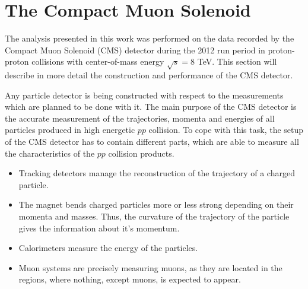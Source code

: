 
\section{The Compact Muon Solenoid}\label{sec:CMS}

The analysis presented in this work was performed on the data recorded by the Compact Muon Solenoid (CMS) detector\cite{CMSatLHC} during the 2012
run period in proton-proton collisions with center-of-mass energy $\sqrt{s} = $8 TeV. This section will describe in more detail 
the construction and performance of the CMS detector.

Any particle detector is being constructed with respect to the measurements which are planned to be done with it. The main purpose of the CMS detector
is the accurate measurement of the trajectories, momenta and energies of all particles produced in high energetic $pp$ collision. 
To cope with this task, the setup of the CMS detector has to contain different parts, which are able to measure all the characteristics of the 
$pp$ collision products.

\begin{itemize}
 \item Tracking detectors manage the reconstruction of the trajectory of a charged particle. 
 
 \item The magnet bends charged particles more or less strong depending on their momenta and masses. 
 Thus, the curvature of the trajectory of the particle gives the information about it's momentum.
 
 \item Calorimeters measure the energy of the particles.
 
 \item Muon systems are precisely measuring muons, as they are located in the regions, where nothing, except muons, is expected to
 appear.
\end{itemize}

